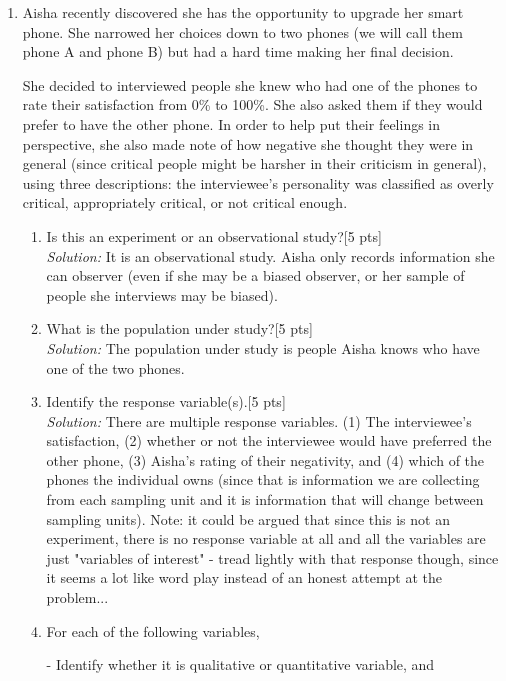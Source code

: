 \documentclass[11pt]{article}\usepackage[]{graphicx}\usepackage[]{color}
\begin{document}
\begin{enumerate}
   \item Aisha recently discovered she has the opportunity to upgrade her smart phone. She narrowed her choices down to two phones (we will call them phone A and phone B) but had a hard time making her final decision.
  
She decided to interviewed people she knew who had one of the phones to rate their satisfaction from 0\% to 100\%.
She also asked them if they would prefer to have the other phone.
In order to help put their feelings in perspective, she also made note of how negative she thought they were in general (since critical people might be harsher in their criticism in general),
using three descriptions: the interviewee's personality was classified as overly critical, appropriately critical, or not critical enough. 

\begin{enumerate}
   \item Is this an experiment or an observational study?[5 pts]\\
   \emph{Solution:}    It is an observational study. Aisha only records information she can observer (even if she may be a biased observer, or her sample of people she interviews may be biased).

   \item What is the population under study?[5 pts]\\
   \emph{Solution:}  The population under study is people Aisha knows who have one of the two phones.


   \item Identify the response variable(s).[5 pts]\\
   \emph{Solution:} There are multiple response variables. (1) The interviewee's satisfaction, (2) whether or not the interviewee would have preferred the other phone, (3) Aisha's rating of their negativity, and (4) which of the phones the individual owns (since that is information we are collecting from each sampling unit and it is information that will change between sampling units). Note: it could be argued that since this is not an experiment, there is no response variable at all and all the variables are just "variables of interest" - tread lightly with that response though, since it seems a lot like word play instead of an honest attempt at the problem...

   \item For each of the following variables, 



      - Identify whether it is qualitative or quantitative variable, and 


\end{enumerate}
\end{enumerate}
\end{document}
